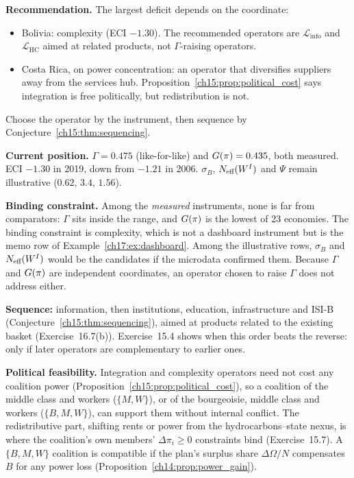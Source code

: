 \documentclass[../solutions_manual.tex]{subfiles}
\begin{document}
 \textbf{Recommendation.} The largest deficit depends on the coordinate:
\begin{itemize}
\item Bolivia: complexity (ECI $-1.30$). The recommended operators are $\mathcal{L}_{\text{info}}$ and $\mathcal{L}_{\text{HC}}$ aimed at related products, not $\Gamma$-raising operators.
\item Costa Rica, on power concentration: an operator that diversifies suppliers away from the services hub. Proposition~\ref{ch15:prop:political_cost} says integration is free politically, but redistribution is not.
\end{itemize}
Choose the operator by the instrument, then sequence by Conjecture~\ref{ch15:thm:sequencing}.


 \textbf{Current position.} $\Gamma = 0.475$ (like-for-like) and $G(\pi) = 0.435$, both measured. ECI $-1.30$ in 2019, down from $-1.21$ in 2006. $\sigma_B$, $N_{\text{eff}}(W^I)$ and $\Psi$ remain illustrative ($0.62$, $3.4$, $1.56$).

 \textbf{Binding constraint.} Among the \emph{measured} instruments, none is far from comparators: $\Gamma$ sits inside the range, and $G(\pi)$ is the lowest of 23 economies. The binding constraint is complexity, which is not a dashboard instrument but is the memo row of Example~\ref{ch17:ex:dashboard}. Among the illustrative rows, $\sigma_B$ and $N_{\text{eff}}(W^I)$ would be the candidates if the microdata confirmed them. Because $\Gamma$ and $G(\pi)$ are independent coordinates, an operator chosen to raise $\Gamma$ does not address either.

 \textbf{Sequence:} information, then institutions, education, infrastructure and ISI-B (Conjecture~\ref{ch15:thm:sequencing}), aimed at products related to the existing basket (Exercise~16.7(b)). Exercise~15.4 shows when this order beats the reverse: only if later operators are complementary to earlier ones.

 \textbf{Political feasibility.} Integration and complexity operators need not cost any coalition power (Proposition~\ref{ch15:prop:political_cost}), so a coalition of the middle class and workers ($\{M, W\}$), or of the bourgeoisie, middle class and workers ($\{B, M, W\}$), can support them without internal conflict. The redistributive part, shifting rents or power from the hydrocarbons--state nexus, is where the coalition's own members' $\Delta\pi_i \ge 0$ constraints bind (Exercise~15.7). A $\{B, M, W\}$ coalition is compatible if the plan's surplus share $\Delta\Omega/N$ compensates $B$ for any power loss (Proposition~\ref{ch14:prop:power_gain}).
\end{document}

